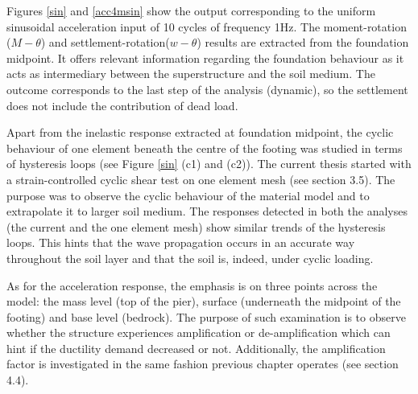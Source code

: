 Figures \ref{sin} and \ref{acc4msin} show the output corresponding to the uniform sinusoidal \mbox{acceleration} input of 10 cycles of frequency 1Hz. The moment-rotation ($M-\theta$) and settlement-rotation($w-\theta$) results are extracted from the foundation midpoint. It offers relevant information regarding the foundation behaviour as it acts as intermediary between the superstructure and the soil medium. The outcome corresponds to the last step of the analysis (dynamic), so the settlement does not include the contribution of dead load.

Apart from the inelastic response extracted at foundation midpoint, the cyclic behaviour of one element beneath the centre of the footing was studied in terms of hysteresis loops (see Figure \ref{sin} (c1) and (c2)). The current thesis started with a strain-controlled cyclic shear test on one element mesh (see section 3.5). The purpose was to observe the cyclic behaviour of the material model and to extrapolate it to larger soil medium. The responses detected in both the analyses (the current and the one element mesh) show similar trends of the hysteresis loops. This hints that the wave propagation occurs in an accurate way throughout the soil layer and that the soil is, indeed, under cyclic loading.

As for the acceleration response, the emphasis is on three points across the model: the mass level (top of the pier), surface (underneath the midpoint of the footing) and base level (bedrock). The purpose of such examination is to observe whether the structure experiences amplification or de-amplification which can hint if the ductility demand decreased or not. Additionally, the amplification factor is investigated in the same fashion previous chapter operates (see section 4.4).

